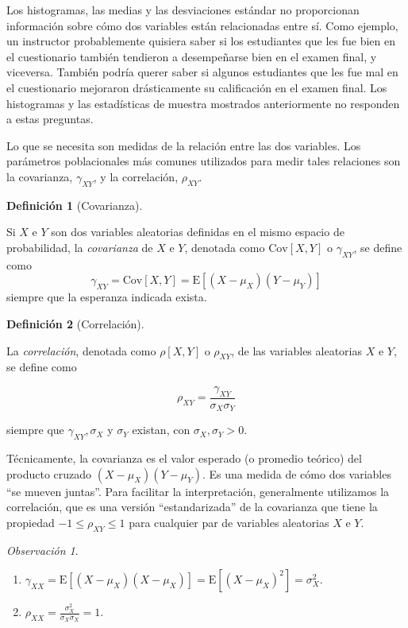 \documentclass[
  letterpaper,
  DIV=11,
  numbers=noendperiod]{scrreport}
\theoremstyle{plain}
\theoremstyle{definition}
\newtheorem{definition}{Definición}[chapter]
\theoremstyle{definition}
\theoremstyle{plain}
\theoremstyle{remark}
\newtheorem*{remark}{Observación}
\begin{document}
Los histogramas, las medias y las desviaciones estándar no proporcionan
información sobre cómo dos variables están relacionadas entre sí. Como
ejemplo, un instructor probablemente quisiera saber si los estudiantes
que les fue bien en el cuestionario también tendieron a desempeñarse
bien en el examen final, y viceversa. También podría querer saber si
algunos estudiantes que les fue mal en el cuestionario mejoraron
drásticamente su calificación en el examen final. Los histogramas y las
estadísticas de muestra mostrados anteriormente no responden a estas
preguntas.

Lo que se necesita son medidas de la relación entre las dos variables.
Los parámetros poblacionales más comunes utilizados para medir tales
relaciones son la covarianza, \(\gamma_{XY}\), y la correlación,
\(\rho_{XY}\).

\begin{definition}[Covarianza]\protect\hypertarget{def-cov}{}\label{def-cov}

Si \(X\) e \(Y\) son dos variables aleatorias definidas en el mismo
espacio de probabilidad, la \emph{covarianza} de \(X\) e \(Y\), denotada
como \(\mathrm{Cov}[X,Y]\) o \(\gamma_{XY}\), se define como
\[\gamma_{XY}=\mathrm{Cov}[X,Y]=\mathrm E[(X-\mu_X)(Y-\mu_Y)]\] siempre
que la esperanza indicada exista.

\end{definition}

\begin{definition}[Correlación]\protect\hypertarget{def-corr}{}\label{def-corr}

La \emph{correlación}, denotada como \(\rho[X,Y]\) o \(\rho_{XY}\), de
las variables aleatorias \(X\) e \(Y\), se define como

\[ \rho_{XY}=\frac{\gamma_{XY}}{\sigma_X \sigma_Y} \]

siempre que \(\gamma_{XY}, \sigma_X\) y \(\sigma_Y\) existan, con
\(\sigma_X, \sigma_Y>0\).

\end{definition}

Técnicamente, la covarianza es el valor esperado (o promedio teórico)
del producto cruzado \((X-\mu_X)(Y-\mu_Y)\). Es una medida de cómo dos
variables ``se mueven juntas''. Para facilitar la interpretación,
generalmente utilizamos la correlación, que es una versión
``estandarizada'' de la covarianza que tiene la propiedad
\(-1 \leq \rho_{XY}\leq 1\) para cualquier par de variables aleatorias
\(X\) e \(Y\).

\begin{remark}
\leavevmode

\begin{enumerate}
\def\labelenumi{\alph{enumi}.}
\item
  \(\gamma_{XX}=\mathrm E[(X-\mu_X)(X-\mu_X)]=\mathrm E[(X-\mu_X)^2]=\sigma_X^2\).
\item
  \(\rho_{XX}=\frac{\sigma_X^2}{\sigma_X \sigma_X}=1\).
\end{enumerate}

\end{remark}
\end{document}
